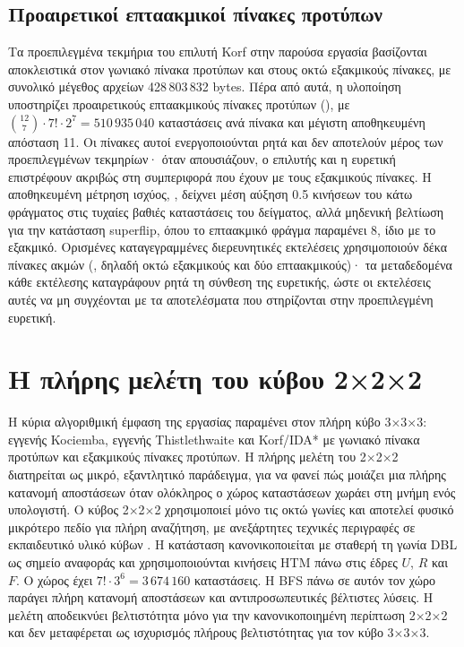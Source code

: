 \subsection{Προαιρετικοί επταακμικοί πίνακες προτύπων}
\label{sec:algorithms-seven-edge}
Τα προεπιλεγμένα τεκμήρια του επιλυτή Korf στην παρούσα εργασία βασίζονται αποκλειστικά στον γωνιακό πίνακα προτύπων και στους οκτώ εξακμικούς πίνακες, με συνολικό μέγεθος αρχείων 428\,803\,832 bytes. Πέρα από αυτά, η υλοποίηση υποστηρίζει προαιρετικούς επταακμικούς πίνακες προτύπων (), με \(\binom{12}{7}\cdot7!\cdot2^7=510\,935\,040\) καταστάσεις ανά πίνακα και μέγιστη αποθηκευμένη απόσταση 11. Οι πίνακες αυτοί ενεργοποιούνται ρητά και δεν αποτελούν μέρος των προεπιλεγμένων τεκμηρίων· όταν απουσιάζουν, ο επιλυτής και η ευρετική επιστρέφουν ακριβώς στη συμπεριφορά που έχουν με τους εξακμικούς πίνακες. Η αποθηκευμένη μέτρηση ισχύος, , δείχνει μέση αύξηση 0.5 κινήσεων του κάτω φράγματος στις τυχαίες βαθιές καταστάσεις του δείγματος, αλλά μηδενική βελτίωση για την κατάσταση superflip, όπου το επταακμικό φράγμα παραμένει 8, ίδιο με το εξακμικό. Ορισμένες καταγεγραμμένες διερευνητικές εκτελέσεις χρησιμοποιούν δέκα πίνακες ακμών (, δηλαδή οκτώ εξακμικούς και δύο επταακμικούς)· τα μεταδεδομένα κάθε εκτέλεσης καταγράφουν ρητά τη σύνθεση της ευρετικής, ώστε οι εκτελέσεις αυτές να μη συγχέονται με τα αποτελέσματα που στηρίζονται στην προεπιλεγμένη ευρετική.

\section{Η πλήρης μελέτη του κύβου 2×2×2}
\label{sec:algorithms-pocket}
Η κύρια αλγοριθμική έμφαση της εργασίας παραμένει στον πλήρη κύβο 3×3×3: εγγενής Kociemba, εγγενής Thistlethwaite και Korf/IDA* με γωνιακό πίνακα προτύπων και εξακμικούς πίνακες προτύπων. Η πλήρης μελέτη του 2×2×2 διατηρείται ως μικρό, εξαντλητικό παράδειγμα, για να φανεί πώς μοιάζει μια πλήρης κατανομή αποστάσεων όταν ολόκληρος ο χώρος καταστάσεων χωράει στη μνήμη ενός υπολογιστή. Ο κύβος 2×2×2 χρησιμοποιεί μόνο τις οκτώ γωνίες και αποτελεί φυσικό μικρότερο πεδίο για πλήρη αναζήτηση, με ανεξάρτητες τεχνικές περιγραφές σε εκπαιδευτικό υλικό κύβων \cite{randelshoferPocketCube}. Η κατάσταση κανονικοποιείται με σταθερή τη γωνία DBL ως σημείο αναφοράς και χρησιμοποιούνται κινήσεις HTM πάνω στις έδρες \(U\), \(R\) και \(F\). Ο χώρος έχει \(7!\cdot3^6=3\,674\,160\) καταστάσεις. Η BFS πάνω σε αυτόν τον χώρο παράγει πλήρη κατανομή αποστάσεων και αντιπροσωπευτικές βέλτιστες λύσεις. Η μελέτη αποδεικνύει βελτιστότητα μόνο για την κανονικοποιημένη περίπτωση 2×2×2 και δεν μεταφέρεται ως ισχυρισμός πλήρους βελτιστότητας για τον κύβο 3×3×3.

